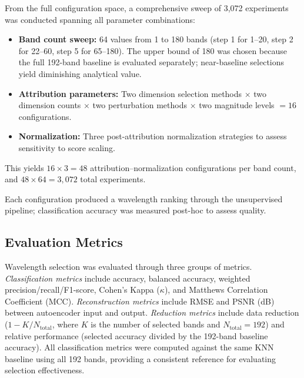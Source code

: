 From the full configuration space, a comprehensive sweep of 3,072 experiments was conducted spanning all parameter combinations:
\begin{itemize}
    \item \textbf{Band count sweep:} 64 values from 1 to 180 bands (step 1 for 1--20, step 2 for 22--60, step 5 for 65--180). The upper bound of 180 was chosen because the full 192-band baseline is evaluated separately; near-baseline selections yield diminishing analytical value.
    \item \textbf{Attribution parameters:} Two dimension selection methods $\times$ two dimension counts $\times$ two perturbation methods $\times$ two magnitude levels $= 16$ configurations.
    \item \textbf{Normalization:} Three post-attribution normalization strategies to assess sensitivity to score scaling.
\end{itemize}
This yields $16 \times 3 = 48$ attribution--normalization configurations per band count, and $48 \times 64 = 3{,}072$ total experiments.

Each configuration produced a wavelength ranking through the unsupervised pipeline; classification accuracy was measured post-hoc to assess quality.

\subsection{Evaluation Metrics}
\label{sec:metrics}

Wavelength selection was evaluated through three groups of metrics.
\emph{Classification metrics} include accuracy, balanced accuracy, weighted precision/recall/F1-score, Cohen's Kappa ($\kappa$), and Matthews Correlation Coefficient (MCC).
\emph{Reconstruction metrics} include RMSE and PSNR (dB) between autoencoder input and output.
\emph{Reduction metrics} include data reduction ($1 - K/N_{\text{total}}$, where $K$ is the number of selected bands and $N_{\text{total}} = 192$) and relative performance (selected accuracy divided by the 192-band baseline accuracy).
All classification metrics were computed against the same KNN baseline using all 192 bands, providing a consistent reference for evaluating selection effectiveness.
